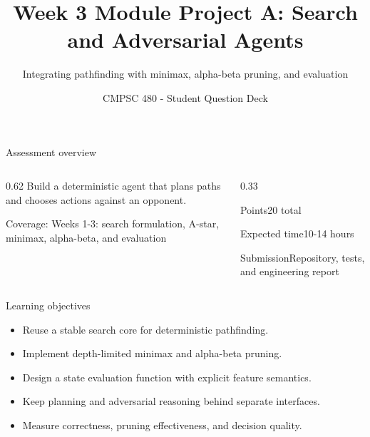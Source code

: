 \documentclass[aspectratio=169,11pt]{beamer}
\title[Module Project A Questions]{Week 3 Module Project A: Search and Adversarial Agents}
\subtitle{Integrating pathfinding with minimax, alpha-beta pruning, and evaluation}
\author{CMPSC 480 - Student Question Deck}
\date{}
\begin{document}
\begin{frame}
  \titlepage
\end{frame}

\begin{frame}{Assessment overview}
\begin{columns}[T,onlytextwidth]
\begin{column}{0.62\textwidth}
\Large Build a deterministic agent that plans paths and chooses actions against an opponent.

\vspace{0.35cm}
\normalsize
Coverage: Weeks 1-3: search formulation, A-star, minimax, alpha-beta, and evaluation
\end{column}
\begin{column}{0.33\textwidth}
\begin{block}{Points}20 total\end{block}
\begin{block}{Expected time}10-14 hours\end{block}
\begin{block}{Submission}Repository, tests, and engineering report\end{block}
\end{column}
\end{columns}
\end{frame}

\begin{frame}{Learning objectives}
\begin{itemize}
  \item Reuse a stable search core for deterministic pathfinding.
  \item Implement depth-limited minimax and alpha-beta pruning.
  \item Design a state evaluation function with explicit feature semantics.
  \item Keep planning and adversarial reasoning behind separate interfaces.
  \item Measure correctness, pruning effectiveness, and decision quality.
\end{itemize}
\end{frame}
\end{document}

